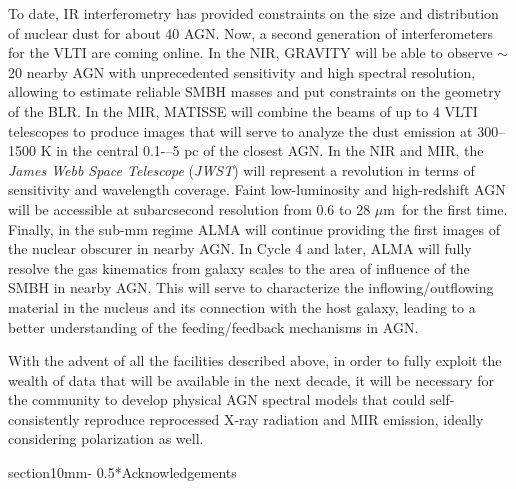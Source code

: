 \documentclass{natureprintstyle}
\makeatletter
\def\micron{$\mu$m}
\renewcommand{\section}{\@startsection%
{section}{1}{0mm}{-\baselineskip}%
{0.5\baselineskip}{\normalfont\Large\bfseries}}%
\makeatother
\begin{document}
To date, IR interferometry has provided constraints on the size and distribution of nuclear dust for about 40 AGN. Now, a second generation of interferometers for the VLTI are coming online. In the NIR, GRAVITY\cite{Eisenhauer11} will be able to observe $\sim$20 nearby AGN with unprecedented sensitivity and high spectral resolution, allowing to estimate reliable SMBH masses and put constraints on the geometry of the BLR. In the MIR, MATISSE\cite{Lopez14b} will combine the beams of up to 4 VLTI telescopes {to produce images that will serve to analyze} the dust emission at 300--1500 K in the central 0.1-–5 pc of the closest AGN. In the NIR and MIR, the {\it James Webb Space Telescope\cite{Gardner2006}} ({\it JWST}) will represent a revolution in terms of sensitivity and wavelength coverage. %
Faint low-luminosity and high-redshift AGN will be accessible at subarcsecond resolution from 0.6 to 28 \micron~for the first time. 
Finally, in the sub-mm regime ALMA will continue providing the first images of the nuclear obscurer in nearby AGN. In Cycle 4 and later, {ALMA will fully resolve} the gas kinematics 
from galaxy scales to the area of influence of the SMBH in nearby AGN. This will serve to characterize the inflowing/outflowing material in the nucleus and its connection with the 
host galaxy, leading to a better understanding of the feeding/feedback mechanisms in AGN.


With the advent of all the facilities described above, in order to fully exploit the wealth of data that will be available in the next decade, it will be necessary for the community 
to develop physical AGN spectral models that could self-consistently reproduce reprocessed X-ray radiation and MIR emission, ideally considering polarization as well. 

\section*{Acknowledgements}
\end{document}
